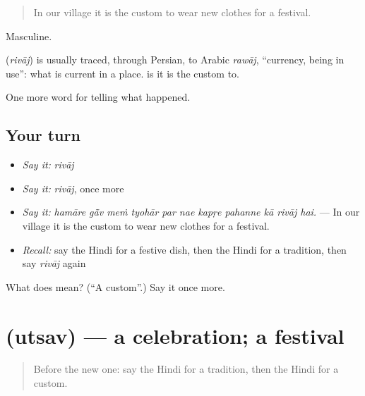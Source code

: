 \begin{quote}
In our village it is the custom to wear new clothes for a festival.
\end{quote}

Masculine.

\begin{cousinweb}
\textbf{} (\emph{rivāj}) is usually traced, through Persian, to Arabic \emph{rawāj}, \textquotedblleft{}currency, being in use\textquotedblright{}: what is current in a place. \textbf{  } is it is the custom to.
\end{cousinweb}

\begin{grammarlens}[title={What you've built}]
One more word for telling what happened.
\end{grammarlens}

\subsection*{Your turn}
\begin{itemize}
\raggedright
  \item \emph{Say it:} \emph{rivāj}
  \item \emph{Say it:} \emph{rivāj}, once more
  \item \emph{Say it:} \emph{hamāre gā̃v meṁ tyohār par nae kapṛe pahanne kā rivāj hai.} — In our village it is the custom to wear new clothes for a festival.
  \item \emph{Recall:} say the Hindi for a festive dish, then the Hindi for a tradition, then say \emph{rivāj} again
\end{itemize}

\begin{tcolorbox}[breakable,colback=teal!4,colframe=teal!35!black,title={Before you move on}]
What does  mean? (\textquotedblleft{}A custom\textquotedblright{}.) Say it once more.
\end{tcolorbox}
\section[\texorpdfstring{\hi{उत्सव} (utsav)}{उत्सव (utsav)}]{ (utsav) — a celebration; a festival}

\label{lesson:HI-C332-utsav}



\begin{quote}
Before the new one: say the Hindi for a tradition, then the Hindi for a custom.
\end{quote}

